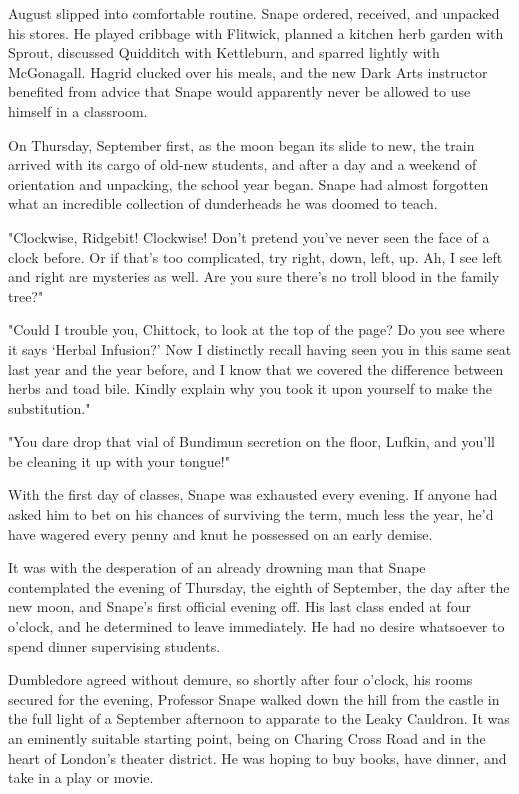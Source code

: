 \documentclass[a4paper,11pt]{article}
\begin{document}
August slipped into comfortable routine. Snape ordered, received, and unpacked his stores. He played cribbage with Flitwick, planned a kitchen herb garden with Sprout, discussed Quidditch with Kettleburn, and sparred lightly with McGonagall. Hagrid clucked over his meals, and the new Dark Arts instructor benefited from advice that Snape would apparently never be allowed to use himself in a classroom.

On Thursday, September first, as the moon began its slide to new, the train arrived with its cargo of old-new students, and after a day and a weekend of orientation and unpacking, the school year began. Snape had almost forgotten what an incredible collection of dunderheads he was doomed to teach.

"Clockwise, Ridgebit! Clockwise! Don't pretend you've never seen the face of a clock before. Or if that's too complicated, try right, down, left, up. Ah, I see left and right are mysteries as well. Are you sure there's no troll blood in the family tree?"

"Could I trouble you, Chittock, to look at the top of the page? Do you see where it says `Herbal Infusion?' Now I distinctly recall having seen you in this same seat last year and the year before, and I know that we covered the difference between herbs and toad bile. Kindly explain why you took it upon yourself to make the substitution."

"You dare drop that vial of Bundimun secretion on the floor, Lufkin, and you'll be cleaning it up with your tongue!"

With the first day of classes, Snape was exhausted every evening. If anyone had asked him to bet on his chances of surviving the term, much less the year, he'd have wagered every penny and knut he possessed on an early demise.

It was with the desperation of an already drowning man that Snape contemplated the evening of Thursday, the eighth of September, the day after the new moon, and Snape's first official evening off. His last class ended at four o'clock, and he determined to leave immediately. He had no desire whatsoever to spend dinner supervising students.

Dumbledore agreed without demure, so shortly after four o'clock, his rooms secured for the evening, Professor Snape walked down the hill from the castle in the full light of a September afternoon to apparate to the Leaky Cauldron. It was an eminently suitable starting point, being on Charing Cross Road and in the heart of London's theater district. He was hoping to buy books, have dinner, and take in a play or movie.
\end{document}
